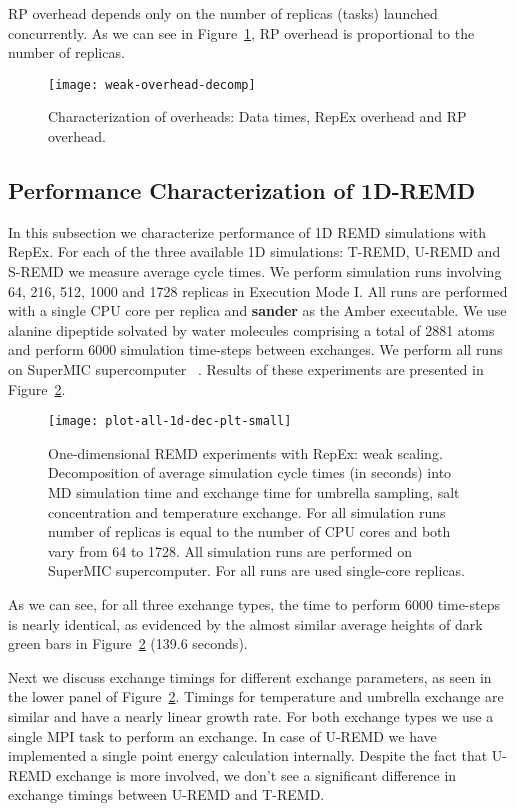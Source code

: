 \documentclass{sig-alternate-05-2015}
\begin{document}
RP overhead depends only on the number of replicas (tasks) launched concurrently. As we can see in Figure~\ref{fig:overheads}, RP overhead is proportional to the number of replicas.   

\begin{figure}[ht!]
  \centering
  \texttt{[image: weak-overhead-decomp]}
  \caption{\small{Characterization of overheads: Data times, RepEx overhead and RP overhead. }
  }
  \label{fig:overheads}
\end{figure}

\subsection{Performance Characterization of 1D-REMD} \label{exp.1d-remd}

In this subsection we characterize performance of 1D REMD simulations with RepEx. For each of the three available 1D simulations: T-REMD, U-REMD and S-REMD we measure average cycle times. We perform simulation runs involving 64, 216, 512, 1000 and 1728 replicas in Execution Mode I. All runs are performed with a single CPU core per replica and \textbf{sander} as the Amber executable. We use alanine dipeptide solvated by water molecules comprising a total of 2881 atoms and perform 6000 simulation time-steps between exchanges. We perform all runs on SuperMIC supercomputer ~\cite{xsede}. Results of these experiments are presented in Figure~\ref{fig:1d_results}.

\begin{figure}[ht!]
  \centering
  \texttt{[image: plot-all-1d-dec-plt-small]}
  \caption{\small{One-dimensional REMD experiments with RepEx: weak scaling. Decomposition of average simulation cycle times  (in seconds) into MD simulation time and exchange time for umbrella sampling, salt concentration and temperature exchange. For all simulation runs number of replicas is equal to the number of CPU cores and both vary from 64 to 1728. All simulation runs are performed on SuperMIC supercomputer. For all  runs are used single-core replicas.}  
  }
  \label{fig:1d_results}
\end{figure}

As we can see, for all three exchange types, the time to perform 6000 time-steps is nearly identical, as evidenced by the almost similar average heights of dark green bars in Figure~\ref{fig:1d_results} (139.6 seconds).

Next we discuss exchange timings for different exchange parameters, as seen in the lower panel of Figure~\ref{fig:1d_results}. Timings for temperature and umbrella exchange are similar and have a nearly linear growth rate. For both exchange types we use a single MPI task to perform an exchange. In case of U-REMD we have implemented a single point energy calculation internally. Despite the fact that U-REMD exchange is more involved, we don't see a significant difference in exchange timings between U-REMD and T-REMD. 
\end{document}
